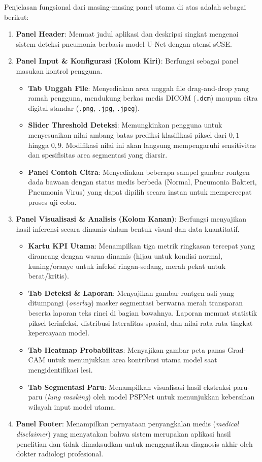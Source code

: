 \documentclass[12pt,a4paper,oneside]{book}
\begin{document}
Penjelasan fungsional dari masing-masing panel utama di atas adalah sebagai berikut:
\begin{enumerate}
  \item \textbf{Panel Header}: Memuat judul aplikasi dan deskripsi singkat mengenai sistem deteksi pneumonia berbasis model U-Net dengan atensi sCSE.
  \item \textbf{Panel Input \& Konfigurasi (Kolom Kiri)}: Berfungsi sebagai panel masukan kontrol pengguna.
    \begin{itemize}
      \item \textbf{Tab Unggah File}: Menyediakan area unggah file drag-and-drop yang ramah pengguna, mendukung berkas medis DICOM (\texttt{.dcm}) maupun citra digital standar (\texttt{.png}, \texttt{.jpg}, \texttt{.jpeg}).
      \item \textbf{Slider Threshold Deteksi}: Memungkinkan pengguna untuk menyesuaikan nilai ambang batas prediksi klasifikasi piksel dari $0,1$ hingga $0,9$. Modifikasi nilai ini akan langsung mempengaruhi sensitivitas dan spesifisitas area segmentasi yang diarsir.
      \item \textbf{Panel Contoh Citra}: Menyediakan beberapa sampel gambar rontgen dada bawaan dengan status medis berbeda (Normal, Pneumonia Bakteri, Pneumonia Virus) yang dapat dipilih secara instan untuk mempercepat proses uji coba.
    \end{itemize}
  \item \textbf{Panel Visualisasi \& Analisis (Kolom Kanan)}: Berfungsi menyajikan hasil inferensi secara dinamis dalam bentuk visual dan data kuantitatif.
    \begin{itemize}
      \item \textbf{Kartu KPI Utama}: Menampilkan tiga metrik ringkasan tercepat yang dirancang dengan warna dinamis (hijau untuk kondisi normal, kuning/oranye untuk infeksi ringan-sedang, merah pekat untuk berat/kritis).
      \item \textbf{Tab Deteksi \& Laporan}: Menyajikan gambar rontgen asli yang ditumpangi (\textit{overlay}) masker segmentasi berwarna merah transparan beserta laporan teks rinci di bagian bawahnya. Laporan memuat statistik piksel terinfeksi, distribusi lateralitas spasial, dan nilai rata-rata tingkat kepercayaan model.
      \item \textbf{Tab Heatmap Probabilitas}: Menyajikan gambar peta panas Grad-CAM untuk menunjukkan area kontribusi utama model saat mengidentifikasi lesi.
      \item \textbf{Tab Segmentasi Paru}: Menampilkan visualisasi hasil ekstraksi paru-paru (\textit{lung masking}) oleh model PSPNet untuk menunjukkan kebersihan wilayah input model utama.
    \end{itemize}
  \item \textbf{Panel Footer}: Menampilkan pernyataan penyangkalan medis (\textit{medical disclaimer}) yang menyatakan bahwa sistem merupakan aplikasi hasil penelitian dan tidak dimaksudkan untuk menggantikan diagnosis akhir oleh dokter radiologi profesional.
\end{enumerate}
\end{document}
